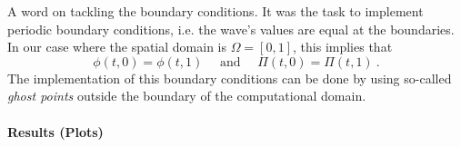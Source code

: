A word on tackling the boundary conditions. It was the task to implement periodic boundary conditions, i.e. the wave's values are equal at the boundaries. In our case where the spatial domain is $\Omega = [0,1]$, this implies that
\begin{equation}
  \phi(t,0) = \phi(t,1) \quad\text{ and } \quad \Pi(t,0) = \Pi(t,1)~.
\end{equation}
The implementation of this boundary conditions can be done by using so-called \emph{ghost points} outside the boundary of the computational domain.


\paragraph{Results (Plots)}




